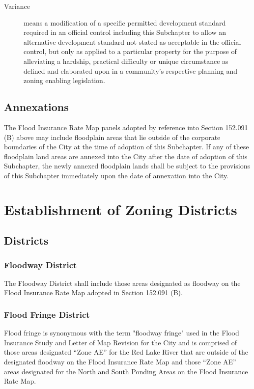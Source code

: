 \begin{description}
\begin{enumerate}[{\indent}a)]
        \end{enumerate}
    \item[Variance] means a modification of a specific permitted development standard required in an official control including this Subchapter to allow an alternative development standard not stated as acceptable in the official control, but only as applied to a particular property for the purpose of alleviating a hardship, practical difficulty or unique circumstance as defined and elaborated upon in a community's respective planning and zoning enabling legislation.
\end{description}
\subsection{Annexations}
The Flood Insurance Rate Map panels adopted by reference into Section 152.091 (B) above may include floodplain areas that lie outside of the corporate boundaries of the City at the time of adoption of this Subchapter. If any of these floodplain land areas are annexed into the City after the date of adoption of this Subchapter, the newly annexed floodplain lands shall be subject to the provisions of this Subchapter immediately upon the date of annexation into the City.
\section{Establishment of Zoning Districts}
\subsection{Districts}
\subsubsection{Floodway District}
The Floodway District shall include those areas designated as floodway on the Flood Insurance Rate Map adopted in Section 152.091 (B).
\subsubsection{Flood Fringe District}
Flood fringe is synonymous with the term "floodway fringe" used in the Flood Insurance Study and Letter of Map Revision for the City and is comprised of those areas designated “Zone AE” for the Red Lake River that are outside of the designated floodway on the Flood Insurance Rate Map and those “Zone AE” areas designated for the North and South Ponding Areas on the Flood Insurance Rate Map.
